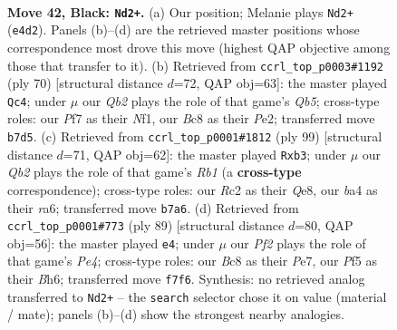\documentclass[11pt]{article}
\begin{document}
\clearpage

\begin{figure}[p]\centering
\begin{subfigure}{0.46\textwidth}\centering
\resizebox{\linewidth}{!}{%
\newchessgame
\chessboard[
  setfen={2b3k1/1q3p1p/6p1/4Pp2/BQ2nP2/7N/P1r3PP/1R3K2 b - - 0 42},
  showmover=false,
  pgfstyle=straightmove, color=movearrow, markmove={e4-d2}
]}
\caption{}
\end{subfigure}\hfill
\begin{subfigure}{0.46\textwidth}\centering
\resizebox{\linewidth}{!}{%
\newchessgame
\chessboard[
  setfen={1r4bk/4q3/6p1/1QRn1p1p/4p3/5PP1/4P1BP/5NK1 w - - 1 36},
  showmover=false,
  pgfstyle=straightmove, color=movearrow, markmove={b5-c4}
]}
\caption{}
\end{subfigure}
\\[4pt]
\begin{subfigure}{0.46\textwidth}\centering
\resizebox{\linewidth}{!}{%
\newchessgame
\chessboard[
  setfen={1r2q1k1/5pp1/R1pQb2p/B2n4/3P3P/1P4P1/5PB1/6K1 b - - 2 50},
  showmover=false,
  pgfstyle=straightmove, color=movearrow, markmove={b8-b3}
]}
\caption{}
\end{subfigure}\hfill
\begin{subfigure}{0.46\textwidth}\centering
\resizebox{\linewidth}{!}{%
\newchessgame
\chessboard[
  setfen={7k/4p2p/3q3b/4pr1P/N2p4/Q3n3/1PP5/1K2R1R1 b - - 0 45},
  showmover=false,
  pgfstyle=straightmove, color=movearrow, markmove={e5-e4}
]}
\caption{}
\end{subfigure}
\caption{\textbf{Move 42, Black: \texttt{Nd2+}.} (a) Our position; Melanie plays \texttt{Nd2+} (\texttt{e4d2}). Panels (b)--(d) are the retrieved master positions whose correspondence most drove this move (highest QAP objective among those that transfer to it). (b) Retrieved from \texttt{ccrl\_top\_p0003\#1192} (ply 70) [structural distance $d$=72, QAP obj=63]: the master played \texttt{Qc4}; under $\mu$ our \emph{Qb2} plays the role of that game's \emph{Qb5}; cross-type roles: our \emph{P}f7 as their \emph{N}f1, our \emph{B}c8 as their \emph{P}e2; transferred move \texttt{b7d5}. (c) Retrieved from \texttt{ccrl\_top\_p0001\#1812} (ply 99) [structural distance $d$=71, QAP obj=62]: the master played \texttt{Rxb3}; under $\mu$ our \emph{Qb2} plays the role of that game's \emph{Rb1} (a \textbf{cross-type} correspondence); cross-type roles: our \emph{R}c2 as their \emph{Q}e8, our \emph{b}a4 as their \emph{r}a6; transferred move \texttt{b7a6}. (d) Retrieved from \texttt{ccrl\_top\_p0001\#773} (ply 89) [structural distance $d$=80, QAP obj=56]: the master played \texttt{e4}; under $\mu$ our \emph{Pf2} plays the role of that game's \emph{Pe4}; cross-type roles: our \emph{B}c8 as their \emph{P}e7, our \emph{P}f5 as their \emph{B}h6; transferred move \texttt{f7f6}. Synthesis: no retrieved analog transferred to \texttt{Nd2+} -- the \texttt{search} selector chose it on value (material / mate); panels (b)--(d) show the strongest nearby analogies.}
\label{fig:thought-m83}
\end{figure}
\end{document}
